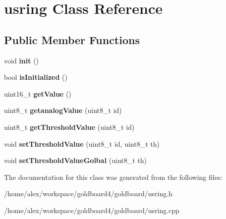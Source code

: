 \hypertarget{classusring}{}\section{usring Class Reference}
\label{classusring}
\subsection*{Public Member Functions}
\begin{DoxyCompactItemize}
\item 
void {\bfseries init} ()\hypertarget{classusring_a321d443eba1e0d0a8d934ed2bd2b62ef}{}\label{classusring_a321d443eba1e0d0a8d934ed2bd2b62ef}

\item 
bool {\bfseries is\+Initialized} ()\hypertarget{classusring_a88b48bd55933924d38f2c2ea0956d529}{}\label{classusring_a88b48bd55933924d38f2c2ea0956d529}

\item 
uint16\+\_\+t {\bfseries get\+Value} ()\hypertarget{classusring_aef8cbedfd02e29767ed71a8da45938a1}{}\label{classusring_aef8cbedfd02e29767ed71a8da45938a1}

\item 
uint8\+\_\+t {\bfseries getanalog\+Value} (uint8\+\_\+t id)\hypertarget{classusring_a79e46727af047f6d2181173f68daae3c}{}\label{classusring_a79e46727af047f6d2181173f68daae3c}

\item 
uint8\+\_\+t {\bfseries get\+Threshold\+Value} (uint8\+\_\+t id)\hypertarget{classusring_a230d462e28252d2029cc70e40d6289fd}{}\label{classusring_a230d462e28252d2029cc70e40d6289fd}

\item 
void {\bfseries set\+Threshold\+Value} (uint8\+\_\+t id, uint8\+\_\+t th)\hypertarget{classusring_a0498d60f7e7908b132968deca273dbf0}{}\label{classusring_a0498d60f7e7908b132968deca273dbf0}

\item 
void {\bfseries set\+Threshold\+Value\+Golbal} (uint8\+\_\+t th)\hypertarget{classusring_a67e0e2972434462c28b9abfbe44da941}{}\label{classusring_a67e0e2972434462c28b9abfbe44da941}

\end{DoxyCompactItemize}


The documentation for this class was generated from the following files\+:\begin{DoxyCompactItemize}
\item 
/home/alex/workspace/goldboard4/goldboard/usring.\+h\item 
/home/alex/workspace/goldboard4/goldboard/usring.\+cpp\end{DoxyCompactItemize}
